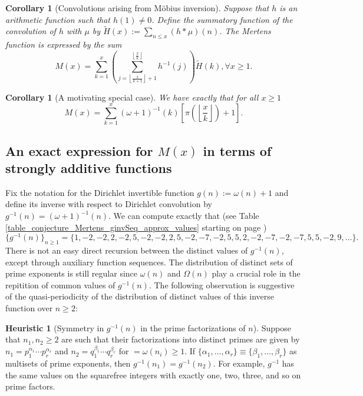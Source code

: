 \documentclass[11pt,reqno,a4letter]{article}
\numberwithin{figure}{section}
\numberwithin{table}{section}
\newcommand{\floor}[1]{\left\lfloor #1 \right\rfloor}
\newcommand{\Floor}[2]{\ensuremath{\left\lfloor \frac{#1}{#2} \right\rfloor}}
\theoremstyle{plain}
\newtheorem{cor}[theorem]{Corollary}
\numberwithin{theorem}{section}
\theoremstyle{definition}
\newtheorem{heuristic}[theorem]{Heuristic}
\begin{document}
\begin{cor}[Convolutions arising from M\"obius inversion] 
\label{cor_CvlGAstMu} 
Suppose that $h$ is an arithmetic function such that 
$h(1) \neq 0$. Define the summatory function of 
the convolution of $h$ with $\mu$ by $\widetilde{H}(x) := \sum_{n \leq x} (h \ast \mu)(n)$. 
The Mertens function is expressed by the sum 
\[
M(x) = \sum_{k=1}^{x} \left(\sum_{j=\floor{\frac{x}{k+1}}+1}^{\floor{\frac{x}{k}}} h^{-1}(j)\right) 
     \widetilde{H}(k), \forall x \geq 1. 
\]
\end{cor} 

\begin{cor}[A motivating special case] 
\label{cor_Mx_gInvnPixk_formula} 
We have exactly that for all $x \geq 1$ 
\begin{equation} 
\label{eqn_Mx_gInvnPixk_formula} 
M(x) = \sum_{k=1}^{x} (\omega+1)^{-1}(k) \left[\pi\left(\Floor{x}{k}\right) + 1\right]. 
\end{equation} 
\end{cor} 

\subsection{An exact expression for $M(x)$ in terms of strongly additive functions} 
\label{example_InvertingARecRelForMx_Intro}

Fix the notation for the Dirichlet invertible function $g(n) := \omega(n) + 1$ and define its 
inverse with respect to Dirichlet convolution by $g^{-1}(n) = (\omega+1)^{-1}(n)$. 
We can compute exactly that 
(see Table \ref{table_conjecture_Mertens_ginvSeq_approx_values} starting on page 
\pageref{table_conjecture_Mertens_ginvSeq_approx_values}) 
\[
\{g^{-1}(n)\}_{n \geq 1} = \{1, -2, -2, 2, -2, 5, -2, -2, 2, 5, -2, -7, -2, 5, 5, 2, -2, -7, -2, 
     -7, 5, 5, -2, 9, \ldots \}. 
\] 
There is not an easy 
direct recursion between the distinct values of $g^{-1}(n)$, except 
through auxiliary function sequences. 
The distribution of distinct sets of prime exponents is still regular since 
$\omega(n)$ and $\Omega(n)$ play a crucial role in the repitition of common values of 
$g^{-1}(n)$. 
The following observation is suggestive of the quasi-periodicity of the distribution of 
distinct values of this inverse function over $n \geq 2$: 

\begin{heuristic}[Symmetry in $g^{-1}(n)$ in the prime factorizations of $n$] 
\label{heuristic_SymmetryIngInvFuncs} 
Suppose that $n_1, n_2 \geq 2$ are such that their factorizations into distinct primes are 
given by $n_1 = p_1^{\alpha_1} \cdots p_r^{\alpha_r}$ and $n_2 = q_1^{\beta_1} \cdots q_r^{\beta_r}$ 
for $ = \omega(n_i) \geq 1$. 
If $\{\alpha_1, \ldots, \alpha_r\} \equiv \{\beta_1, \ldots, \beta_r\}$ as multisets of prime exponents, 
then $g^{-1}(n_1) = g^{-1}(n_2)$. For example, $g^{-1}$ has the same values on the squarefree integers 
with exactly one, two, three, and so on prime factors.  
\end{heuristic} 
\end{document}
